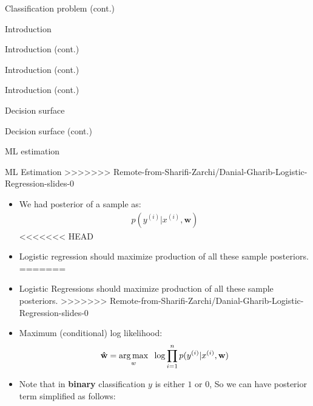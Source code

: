 \documentclass[serif, aspectratio=169]{beamer}
\begin{document}
\begin{frame}{Classification problem (cont.)}
\begin{itemize}
\begin{frame}{Introduction}
\begin{itemize}
\begin{frame}{Introduction (cont.)}
\begin{frame}{Introduction (cont.)}
\begin{frame}{Introduction (cont.)}
\begin{frame}{Decision surface}
\begin{itemize}
\begin{frame}{Decision surface (cont.)}
\begin{frame}{ML estimation}
\begin{frame}{ML Estimation}
>>>>>>> Remote-from-Sharifi-Zarchi/Danial-Gharib-Logistic-Regression-slides-0
    \begin{itemize}
        \item We had posterior of a sample as:
        \begin{align*}
            p(y^{(i)}|x^{(i)},\mathbf{w})
        \end{align*}
<<<<<<< HEAD
        \item Logistic regression should maximize production of all these sample posteriors.
=======
        \item Logistic Regressions should maximize production of all these sample posteriors.
>>>>>>> Remote-from-Sharifi-Zarchi/Danial-Gharib-Logistic-Regression-slides-0
        
        \item Maximum (conditional) log likelihood:
        \begin{align*}
             \mathbf{\hat{w}} = \underset{w}{\arg\max} \hspace{0.2cm} \log \prod_{i=1}^{n} p(y^{(i)}|x^{(i)},\mathbf{w})
        \end{align*}
        \item Note that in \textbf{binary} classification $y$ is either $1$ or $0$, So we can have posterior term simplified as follows:
        

\end{itemize}
\end{frame}
\end{frame}
\end{frame}
\end{itemize}
\end{frame}
\end{frame}
\end{frame}
\end{frame}
\end{itemize}
\end{frame}
\end{itemize}
\end{frame}
\end{document}
